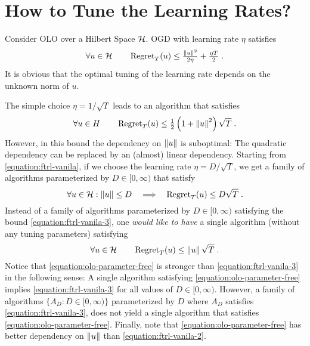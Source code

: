 \section{How to Tune the Learning Rates?}
\label{section:learning-rates}

Consider \ac{OLO} over a Hilbert Space $\mathcal{H}$. \ac{OGD} with learning rate
$\eta$ satisfies~\citep{Shalev-Shwartz-2011}
\begin{equation}
\label{equation:ftrl-vanila}
\forall u \in \mathcal{H} \qquad \operatorname{Regret}_T(u) \le \tfrac{\left\|{u}\right\|^2}{2\eta} + \tfrac{\eta T}{2} \; .
\end{equation}
It is obvious that the optimal tuning of the learning rate depends on the
unknown norm of $u$.

The simple choice $\eta = 1/\sqrt{T}$ leads to an algorithm that satisfies
\begin{equation}
\label{equation:ftrl-vanila-2}
\forall u \in H \qquad \operatorname{Regret}_T(u) \le \tfrac{1}{2}\left(1+\left\|{u}\right\|^2\right)\sqrt{T} \; .
\end{equation}
However, in this bound the dependency on $\left\|{u}\right\|$ is suboptimal: The
quadratic dependency can be replaced by an (almost) linear dependency.
Starting from \eqref{equation:ftrl-vanila}, if we choose the learning rate
$\eta = D/\sqrt{T}$, we get a family of algorithms parameterized by $D \in
[0,\infty)$ that satisfy
\begin{equation}
\label{equation:ftrl-vanila-3}
\forall u \in \mathcal{H} : \left\|{u}\right\| \le D \quad  \Longrightarrow \quad \operatorname{Regret}_T(u) \le D \sqrt{T} \; .
\end{equation}
Instead of a family of algorithms parameterized by $D \in [0,\infty)$ satisfying
the bound \eqref{equation:ftrl-vanila-3}, one \emph{would like
to have} a single algorithm (without any tuning parameters) satisfying
\begin{equation}
\label{equation:olo-parameter-free}
\forall u \in \mathcal{H} \qquad \operatorname{Regret}_T(u) \le \left\|{u}\right\| \sqrt{T} \; .
\end{equation}
Notice that \eqref{equation:olo-parameter-free} is stronger than
\eqref{equation:ftrl-vanila-3} in the following sense: A single algorithm
satisfying \eqref{equation:olo-parameter-free} implies
\eqref{equation:ftrl-vanila-3} for all values of $D \in [0,\infty)$. However,
a family of algorithms $\{A_D : D \in [0,\infty)\}$ parameterized by $D$ where
$A_D$ satisfies \eqref{equation:ftrl-vanila-3}, does not yield a single
algorithm that satisfies \eqref{equation:olo-parameter-free}.  Finally, note
that \eqref{equation:olo-parameter-free} has better dependency on $\left\|{u}\right\|$
than \eqref{equation:ftrl-vanila-2}.

